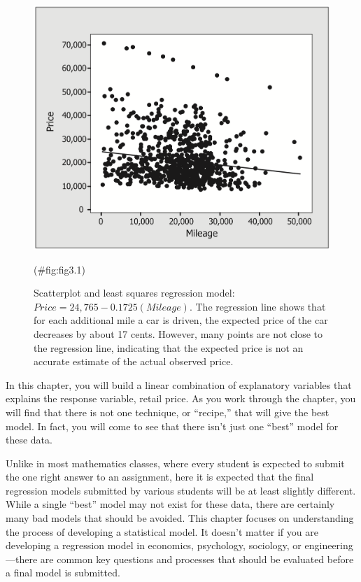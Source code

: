 \documentclass[
]{report}
\begin{document}
\begin{figure}

{\centering \includegraphics[width=1\linewidth]{docs/Fig3_1} 

}

\caption{Scatterplot and least squares regression model: $Price = 24,765 - 0.1725(Mileage)$. The regression line shows that for each additional mile a car is driven, the expected price of the car decreases by about 17 cents. However, many points are not close to the regression line, indicating that the expected price is not an accurate estimate of the actual observed price.}(\#fig:fig3.1)
\end{figure}

In this chapter, you will build a linear combination of explanatory variables that explains the response variable, retail price. As you work through the chapter, you will find that there is not one technique, or ``recipe,'' that will give the best model. In fact, you will come to see that there isn't just one ``best'' model for these data.

Unlike in most mathematics classes, where every student is expected to submit the one right answer to an assignment, here it is expected that the final regression models submitted by various students will be at least slightly different. While a single ``best'' model may not exist for these data, there are certainly many bad models that should be avoided. This chapter focuses on understanding the process of developing a statistical
model. It doesn't matter if you are developing a regression model in economics, psychology, sociology, or engineering---there are common key questions and processes that should be evaluated before a final model is submitted.
\end{document}
